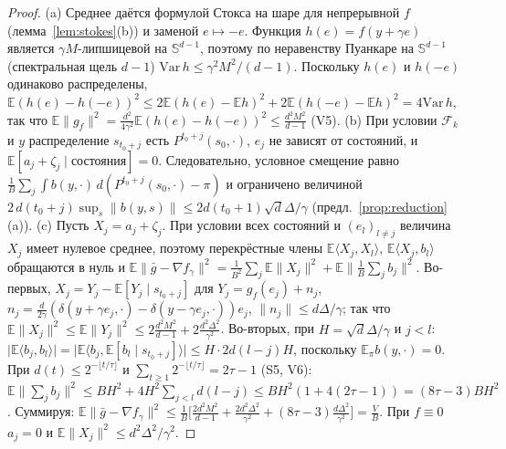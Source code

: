 \documentclass[11pt,a4paper]{article}
\numberwithin{equation}{section}
\theoremstyle{definition}
\theoremstyle{remark}
\newcommand{\E}{\mathbb E}\newcommand{\R}{\mathbb R}\newcommand{\N}{\mathbb N}\let\Prob\relax\newcommand{\Prob}{\mathbb P}
\newcommand{\norm}[1]{\lVert #1\rVert}\newcommand{\abs}[1]{\lvert #1\rvert}\newcommand{\ip}[2]{\langle #1,#2\rangle}
\newcommand{\Sph}{\mathbb S^{d-1}}\newcommand{\Ball}{\mathbb B}
\begin{document}
\begin{proof}
(a) Среднее даётся формулой Стокса на шаре для непрерывной $f$ (лемма~\ref{lem:stokes}(b)) и заменой $e\mapsto-e$. Функция $h(e)=f(y+\gamma e)$ является $\gamma M$-липшицевой на $\Sph$, поэтому по неравенству Пуанкаре на $\Sph$ (спектральная щель $d-1$) $\mathrm{Var}\,h\le\gamma^2M^2/(d-1)$. Поскольку $h(e)$ и $h(-e)$ одинаково распределены, $\E(h(e)-h(-e))^2\le2\E(h(e)-\E h)^2+2\E(h(-e)-\E h)^2=4\mathrm{Var}\,h$, так что $\E\norm{g_f}^2=\frac{d^2}{4\gamma^2}\E(h(e)-h(-e))^2\le\frac{d^2M^2}{d-1}$ (V5).
(b) При условии $\mathcal F_k$ и $y$ распределение $s_{t_0+j}$ есть $P^{t_0+j}(s_0,\cdot)$, $e_j$ не зависят от состояний, и $\E[a_j+\zeta_j\mid\text{состояния}]=0$. Следовательно, условное смещение равно $\frac1B\sum_j\int b(y,\cdot)\,d(P^{t_0+j}(s_0,\cdot)-\pi)$ и ограничено величиной $2\,d(t_0+j)\sup_s\norm{b(y,s)}\le2d(t_0+1)\sqrt d\Delta/\gamma$ (предл.~\ref{prop:reduction}(a)).
(c) Пусть $X_j=a_j+\zeta_j$. При условии всех состояний и $(e_l)_{l\ne j}$ величина $X_j$ имеет нулевое среднее, поэтому перекрёстные члены $\E\ip{X_j}{X_l}$, $\E\ip{X_j}{b_l}$ обращаются в нуль и
$\E\norm{\bar g-\nabla f_\gamma}^2=\frac1{B^2}\sum_j\E\norm{X_j}^2+\E\norm{\tfrac1B\sum_jb_j}^2$.
Во-первых, $X_j=Y_j-\E[Y_j\mid s_{t_0+j}]$ для $Y_j=g_f(e_j)+n_j$, $n_j=\frac d{2\gamma}(\delta(y+\gamma e_j,\cdot)-\delta(y-\gamma e_j,\cdot))e_j$, $\norm{n_j}\le d\Delta/\gamma$; так что $\E\norm{X_j}^2\le\E\norm{Y_j}^2\le2\frac{d^2M^2}{d-1}+2\frac{d^2\Delta^2}{\gamma^2}$.
Во-вторых, при $H=\sqrt d\Delta/\gamma$ и $j<l$: $\abs{\E\ip{b_j}{b_l}}=\abs{\E\ip{b_j}{\E[b_l\mid s_{t_0+j}]}}\le H\cdot2d(l-j)H$, поскольку $\E_\pi b(y,\cdot)=0$. При $d(t)\le2^{-\lfloor t/\tau\rfloor}$ и $\sum_{t\ge1}2^{-\lfloor t/\tau\rfloor}=2\tau-1$ (S5, V6):
$\E\norm{\sum_jb_j}^2\le BH^2+4H^2\sum_{j<l}d(l-j)\le BH^2(1+4(2\tau-1))=(8\tau-3)BH^2$.
Суммируя: $\E\norm{\bar g-\nabla f_\gamma}^2\le\frac1B\big[\frac{2d^2M^2}{d-1}+\frac{2d^2\Delta^2}{\gamma^2}+(8\tau-3)\frac{d\Delta^2}{\gamma^2}\big]=\frac VB$. При $f\equiv0$ $a_j=0$ и $\E\norm{X_j}^2\le d^2\Delta^2/\gamma^2$.
\end{proof}
\end{document}
